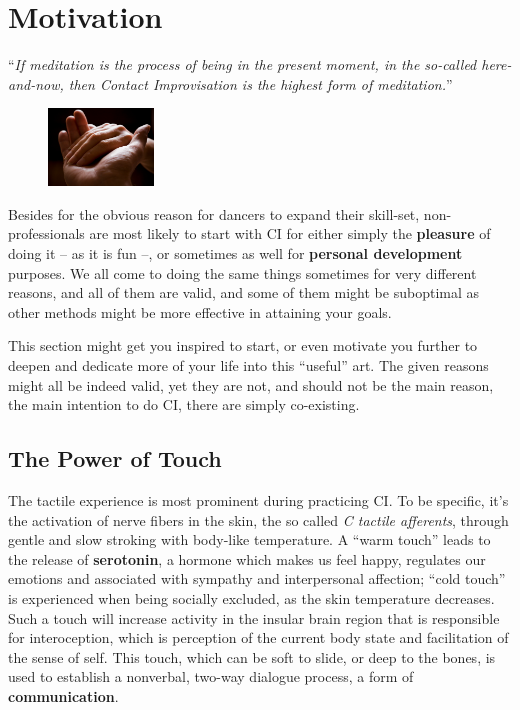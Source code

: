 \chapter{Motivation}\label{ch:motivation}

\begin{displayquote}
    ``\textit{If meditation is the process of being in the present moment, in the so-called here-and-now, then Contact Improvisation is the highest form of meditation.}''
\end{displayquote}

\begin{figure}
    \centering
    \includegraphics[width=0.25\textwidth]{images/motivation}
\end{figure}

Besides for the obvious reason for dancers to expand their skill-set, non-professionals are most likely to start with CI for either simply the \textbf{pleasure} of doing it -- as it is fun --, or sometimes as well for \textbf{personal development} purposes.
We all come to doing the same things sometimes for very different reasons, and all of them are valid, and some of them might be suboptimal as other methods might be more effective in attaining your goals.

This section might get you inspired to start, or even motivate you further to deepen and dedicate more of your life into this ``useful'' art.
The given reasons might all be indeed valid, yet they are not, and should not be the main reason, the main intention to do CI, there are simply co-existing.

\section{The Power of Touch}\label{sec:the-power-of-touch}

The tactile experience is most prominent during practicing CI. To be specific, it's the activation of nerve fibers in the skin, the so called \textit{C tactile afferents}, through gentle and slow stroking with body-like temperature.
A ``warm touch'' leads to the release of \textbf{serotonin}, a hormone which makes us feel happy, regulates our emotions and associated with sympathy and interpersonal affection; ``cold touch'' is experienced when being socially excluded, as the skin temperature decreases.
Such a touch will increase activity in the insular brain region that is responsible for interoception, which is perception of the current body state and facilitation of the sense of self.
This touch, which can be soft to slide, or deep to the bones, is used to establish a nonverbal, two-way dialogue process, a form of \textbf{communication}.

